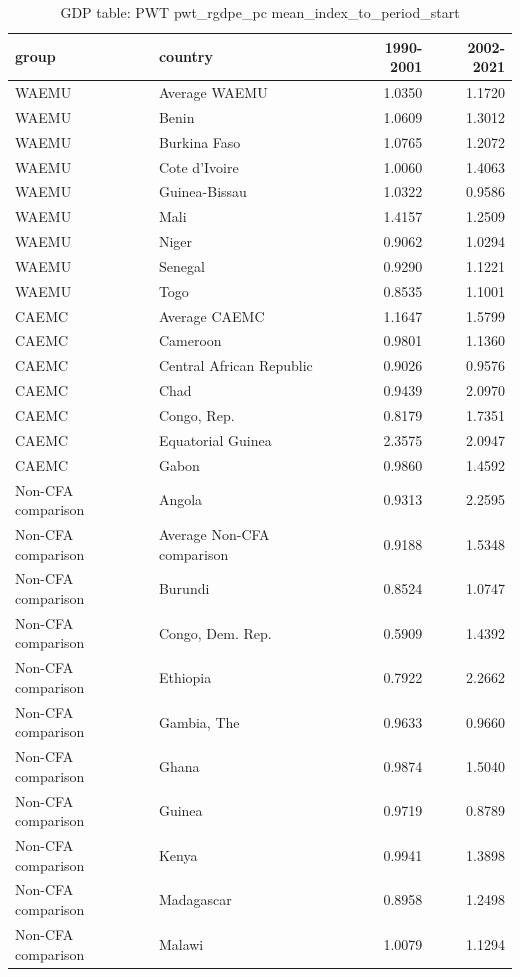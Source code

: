 \begin{table}

\caption{GDP table: PWT pwt_rgdpe_pc mean_index_to_period_start}
\centering
\begin{tabular}[t]{llrr}
\toprule
group & country & 1990-2001 & 2002-2021\\
\midrule
WAEMU & Average WAEMU & 1.0350 & 1.1720\\
WAEMU & Benin & 1.0609 & 1.3012\\
WAEMU & Burkina Faso & 1.0765 & 1.2072\\
WAEMU & Cote d'Ivoire & 1.0060 & 1.4063\\
WAEMU & Guinea-Bissau & 1.0322 & 0.9586\\
\addlinespace
WAEMU & Mali & 1.4157 & 1.2509\\
WAEMU & Niger & 0.9062 & 1.0294\\
WAEMU & Senegal & 0.9290 & 1.1221\\
WAEMU & Togo & 0.8535 & 1.1001\\
CAEMC & Average CAEMC & 1.1647 & 1.5799\\
\addlinespace
CAEMC & Cameroon & 0.9801 & 1.1360\\
CAEMC & Central African Republic & 0.9026 & 0.9576\\
CAEMC & Chad & 0.9439 & 2.0970\\
CAEMC & Congo, Rep. & 0.8179 & 1.7351\\
CAEMC & Equatorial Guinea & 2.3575 & 2.0947\\
\addlinespace
CAEMC & Gabon & 0.9860 & 1.4592\\
Non-CFA comparison & Angola & 0.9313 & 2.2595\\
Non-CFA comparison & Average Non-CFA comparison & 0.9188 & 1.5348\\
Non-CFA comparison & Burundi & 0.8524 & 1.0747\\
Non-CFA comparison & Congo, Dem. Rep. & 0.5909 & 1.4392\\
\addlinespace
Non-CFA comparison & Ethiopia & 0.7922 & 2.2662\\
Non-CFA comparison & Gambia, The & 0.9633 & 0.9660\\
Non-CFA comparison & Ghana & 0.9874 & 1.5040\\
Non-CFA comparison & Guinea & 0.9719 & 0.8789\\
Non-CFA comparison & Kenya & 0.9941 & 1.3898\\
\addlinespace
Non-CFA comparison & Madagascar & 0.8958 & 1.2498\\
Non-CFA comparison & Malawi & 1.0079 & 1.1294\\

\end{tabular}
\end{table}
